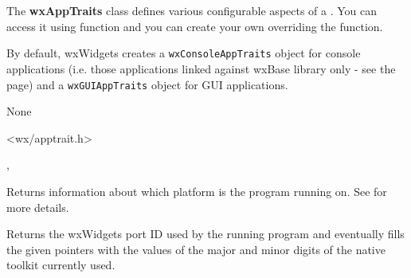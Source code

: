 
\section{}\label{wxapptraits}

The {\bf wxAppTraits} class defines various configurable aspects of a .
You can access it using  function and you can
create your own  overriding the
 function.

By default, wxWidgets creates a {\tt wxConsoleAppTraits} object for console applications
(i.e. those applications linked against wxBase library only - see the
 page) and a {\tt wxGUIAppTraits} object for GUI
applications.


None


<wx/apptrait.h>


, 



\label{wxapptraitsgetplatforminfo}


Returns information about which platform is the program running on.
See  for more details.


\label{wxapptraitsgettoolkitversion}


Returns the wxWidgets port ID used by the running program and eventually
fills the given pointers with the values of the major and minor digits
of the native toolkit currently used.

